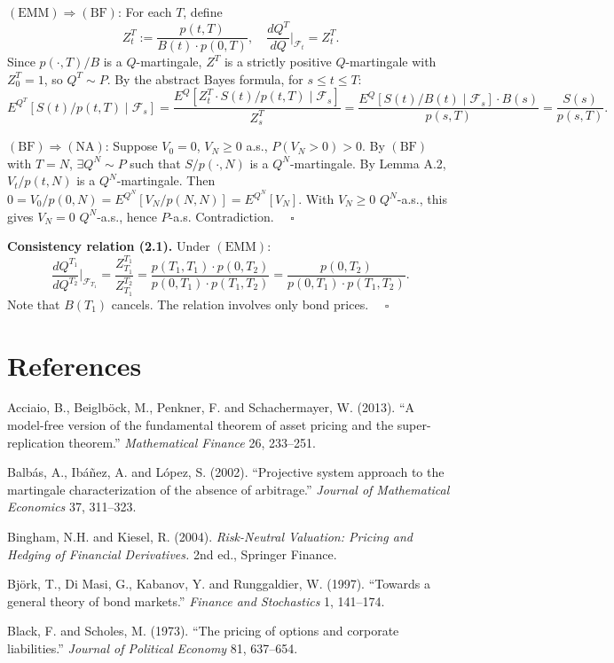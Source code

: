 \documentclass[
]{article}
\begin{document}
\((\text{EMM}) \Rightarrow (\text{BF})\): For each \(T\), define
\[Z^T_t := \frac{p(t,T)}{B(t) \cdot p(0,T)}, \quad
  \frac{dQ^T}{dQ}\bigg|_{\mathcal{F}_t} = Z^T_t.\] Since
\(p(\cdot,T)/B\) is a \(Q\)-martingale, \(Z^T\) is a strictly positive
\(Q\)-martingale with \(Z^T_0 = 1\), so \(Q^T \sim P\). By the abstract
Bayes formula, for \(s \le t \le T\):
\[E^{Q^T}[S(t)/p(t,T) \mid \mathcal{F}_s]
  = \frac{E^Q[Z^T_t \cdot S(t)/p(t,T) \mid \mathcal{F}_s]}{Z^T_s}
  = \frac{E^Q[S(t)/B(t) \mid \mathcal{F}_s] \cdot B(s)}{p(s,T)}
  = \frac{S(s)}{p(s,T)}.\]

\((\text{BF}) \Rightarrow (\text{NA})\): Suppose \(V_0 = 0\),
\(V_N \ge 0\) a.s., \(P(V_N > 0) > 0\). By \((\text{BF})\) with
\(T = N\), \(\exists Q^N \sim P\) such that \(S/p(\cdot,N)\) is a
\(Q^N\)-martingale. By Lemma A.2, \(V_t/p(t,N)\) is a
\(Q^N\)-martingale. Then \(0 = V_0/p(0,N) = E^{Q^N}[V_N/p(N,N)]
= E^{Q^N}[V_N]\). With \(V_N \ge 0\) \(Q^N\)-a.s., this gives
\(V_N = 0\) \(Q^N\)-a.s., hence \(P\)-a.s. Contradiction.
\(\quad\square\)

\textbf{Consistency relation (2.1).} Under \((\text{EMM})\):
\[\frac{dQ^{T_1}}{dQ^{T_2}}\bigg|_{\mathcal{F}_{T_1}}
  = \frac{Z^{T_1}_{T_1}}{Z^{T_2}_{T_1}}
  = \frac{p(T_1,T_1) \cdot p(0,T_2)}{p(0,T_1) \cdot p(T_1,T_2)}
  = \frac{p(0,T_2)}{p(0,T_1) \cdot p(T_1,T_2)}.\] Note that \(B(T_1)\)
cancels. The relation involves only bond prices. \(\quad\square\)

\section{References}\label{references}

Acciaio, B., Beiglböck, M., Penkner, F. and Schachermayer, W. (2013).
``A model-free version of the fundamental theorem of asset pricing and
the super-replication theorem.'' \emph{Mathematical Finance} 26,
233--251.

Balbás, A., Ibáñez, A. and López, S. (2002). ``Projective system
approach to the martingale characterization of the absence of
arbitrage.'' \emph{Journal of Mathematical Economics} 37, 311--323.

Bingham, N.H. and Kiesel, R. (2004). \emph{Risk-Neutral Valuation:
Pricing and Hedging of Financial Derivatives.} 2nd ed., Springer
Finance.

Björk, T., Di Masi, G., Kabanov, Y. and Runggaldier, W. (1997).
``Towards a general theory of bond markets.'' \emph{Finance and
Stochastics} 1, 141--174.

Black, F. and Scholes, M. (1973). ``The pricing of options and corporate
liabilities.'' \emph{Journal of Political Economy} 81, 637--654.
\end{document}
